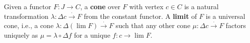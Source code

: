 Given a functor $F: J \rightarrow C$, a \textbf{cone} over $F$ with vertex $c \in C$ is a natural transformation $\lambda: \Delta c \xrightarrow{\cdot} F$ from the constant functor. A \textbf{limit} of $F$ is a universal cone, i.e., a cone $\lambda: \Delta(\lim F) \xrightarrow{\cdot} F$ such that any other cone $\mu: \Delta c \xrightarrow{\cdot} F$ factors uniquely as $\mu = \lambda \circ \Delta f$ for a unique $f: c \rightarrow \lim F$.